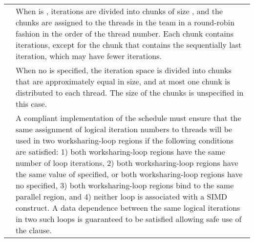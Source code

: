 \tablefirsthead{%
\hline\\[-3ex]
}
\tablelasttail{\hline}
\begin{supertabular}{ p{0.8in} p{4.3in} }

{} & When  is ,
                   iterations are divided into chunks of size
                   {}, and the chunks are assigned to the 
                   threads in the team in a round-robin fashion in the order 
                   of the thread number. Each chunk contains {} 
                   iterations, except for the chunk that contains the sequentially 
                   last iteration, which may have fewer iterations.\\

                 & When no {} is specified, the iteration space is 
                   divided into chunks that are approximately equal in size, and at 
                   most one chunk is distributed to each thread. The size of the 
                   chunks is unspecified in this case.\\

                 & A compliant implementation of the {} schedule must 
                   ensure that the same assignment of logical iteration numbers to
                   threads will be used in two worksharing-loop regions if the 
                   following conditions are satisfied: 1) both worksharing-loop 
                   regions have the same number of loop iterations, 2) both 
                   worksharing-loop regions have the same value of {} 
                   specified, or both worksharing-loop regions have no 
                   {} specified, 3) both worksharing-loop regions 
                   bind to the same parallel region, and 4) neither loop is
                   associated with a SIMD construct. A data dependence between the 
                   same logical iterations in two such loops is guaranteed to be 
                   satisfied allowing safe use of the {} clause.\\


\end{supertabular}

